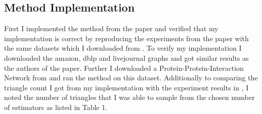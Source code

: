 \documentclass[12pt,twoside,a4paper]{report}
\begin{document}
\subsection{Method Implementation}
First I implemented the method from the paper and verified that my implementation is correct by reproducing the experiments from the paper with the same datasets which I downloaded from \cite{stan}. To verify my implementation I downloaded the amazon, dblp and livejournal graphs and got similar results as the authors of the paper. Further I downloaded a Protein-Protein-Interaction Network from \cite{biogrid} and ran the method on this dataset. Additionally to comparing the triangle count I got from my implementation with the experiment results in \cite{countsample}, I noted the number of triangles that I was able to sample from the chosen number of estimators as listed in Table 1. 
\begin{center}
\begin{table}
\caption{This table lists the triangle count my implementation estimated ($\tau_{est}$) for the graphs I downloaded from \cite{stan} and \cite{biogrid}. Because the triangle count estimation $\tau_{est}$ I got from my implementation agrees with the results in \cite{countsample} I can be confident that my implementation of the method is bug free.  Additionally this table lists the number of triangles that I could draw from the estimators $s$ which was not evaluated in the paper.}
\end{table}
\end{center}
\end{document}
